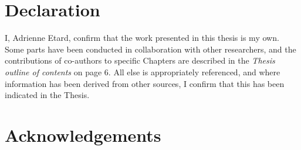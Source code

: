 \documentclass[11pt]{report}
\begin{document}
\begin{refsection}



\chapter*{Declaration}

I, Adrienne Etard, confirm that the work presented in this thesis is my own. Some parts have been conducted in collaboration with other researchers, and the contributions of co-authors to specific Chapters are described in the \textit{Thesis outline of contents} on page 6. All else is appropriately referenced, and where information has been derived from other sources, I confirm that this has been indicated in the Thesis.





\chapter*{Acknowledgements}

\begin{comment}
First and foremost, huge thanks to my primary supervisor, Tim Newbold, whose guidance has been pivotal to the completion of this PhD journey. I am extremely grateful to Tim for enabling, trusting and encouraging me throughout, for the countless opportunities, for his availability and optimism.

I am equally grateful to Alex Pigot for welcoming me in his lab, for his cutting-edge insights on my work, and for the weekly Zoom meetings that made remote-working more bearable throughout the various phases of the Covid-19 pandemic.

I would like to extend my thanks to the wonderful people of CBER, both to those with whom I have directly collaborated and to those who have facilitated my work in this journey with insightful conversations. Thank you for making the workplace a friendly, constructive and welcoming environment.

To my friends in London and elsewhere who put up with my shenaniggans. In particular, Yumi \& Tom. To my family for their spirits and their support, Anne, Jean--François, Vivien, Octave \& Caroline.
 

\end{comment}
\end{refsection}
\end{document}
